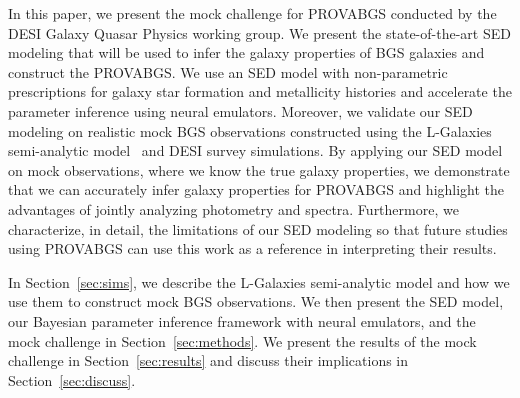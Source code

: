 
In this paper, we present the mock challenge for PROVABGS conducted by the DESI
Galaxy Quasar Physics working group. 
We present the state-of-the-art SED modeling that will be used to infer the
galaxy properties of BGS galaxies and construct the PROVABGS. 
We use an SED model with non-parametric prescriptions for galaxy star formation
and metallicity histories and accelerate the parameter inference using neural
emulators. 
Moreover, we validate our SED modeling on realistic mock BGS observations
constructed using the {\sc L-Galaxies} semi-analytic
model~\citep{henriques2015} and DESI survey simulations. 
By applying our SED model on mock observations, where we know the true galaxy
properties, we demonstrate that we can accurately infer galaxy properties for
PROVABGS and highlight the advantages of jointly analyzing photometry and
spectra. 
Furthermore, we characterize, in detail, the limitations of our SED modeling so
that future studies using PROVABGS can use this work as a reference in
interpreting their results. 

In Section~\ref{sec:sims}, we describe the {\sc L-Galaxies} semi-analytic
model and how we use them to construct mock BGS observations. 
We then present the SED model, our Bayesian parameter inference framework with
neural emulators, and the mock challenge in Section~\ref{sec:methods}. 
We present the results of the mock challenge in Section~\ref{sec:results} and
discuss their implications in Section~\ref{sec:discuss}. 
